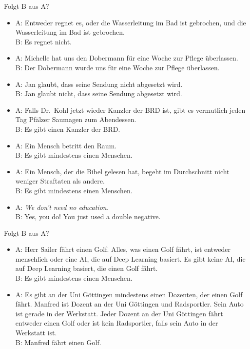\begin{frame}
  {Folgt B aus A?} %
  \begin{itemize}[<+->]\small
    \item A: Entweder regnet es, oder die Wasserleitung im Bad ist gebrochen, und die Wasserleitung im Bad ist gebrochen.\\
      \alert{B: Es regnet nicht.}
    \item A: Michelle hat uns den Dobermann für eine Woche zur Pflege überlassen.\\
      \alert{B: Der Dobermann wurde uns für eine Woche zur Pflege überlassen.}
    \item A: Jan glaubt, dass seine Sendung nicht abgesetzt wird.\\
      \alert{B: Jan glaubt nicht, dass seine Sendung abgesetzt wird.}
    \item A: Falls Dr.\ Kohl jetzt wieder Kanzler der BRD ist, gibt es vermutlich jeden Tag Pfälzer Saumagen zum Abendessen.\\
      \alert{B: Es gibt einen Kanzler der BRD.}
    \item A: Ein Mensch betritt den Raum.\\
      \alert{B: Es gibt mindestens einen Menschen.}
    \item A: Ein Mensch, der die Bibel gelesen hat, begeht im Durchschnitt nicht weniger Straftaten als andere.\\
      \alert{B: Es gibt mindestens einen Menschen.}
    \item A: \textit{We don't need no education.}\\
      \alert{B: Yes, you do! You just used a double negative.}
  \end{itemize}
\end{frame}

\begin{frame}
  {Folgt B aus A?} %
  \onslide<+->
  \begin{itemize}[<+->]
    \item A: Herr Sailer fährt einen Golf. Alles, was einen Golf fährt, ist entweder menschlich oder eine AI, die auf Deep Learning basiert. Es gibt keine AI, die auf Deep Learning basiert, die einen Golf fährt.\\
      \alert{B: Es gibt mindestens einen Menschen.}
      \Halbzeile
    \item A: Es gibt an der Uni Göttingen mindestens einen Dozenten, der einen Golf fährt. Manfred ist Dozent an der Uni Göttingen und Radsportler. Sein Auto ist gerade in der Werkstatt. Jeder Dozent an der Uni Göttingen fährt entweder einen Golf oder ist kein Radsportler, falls sein Auto in der Werkstatt ist.\\
      \alert{B: Manfred fährt einen Golf.}
  \end{itemize}
\end{frame}

